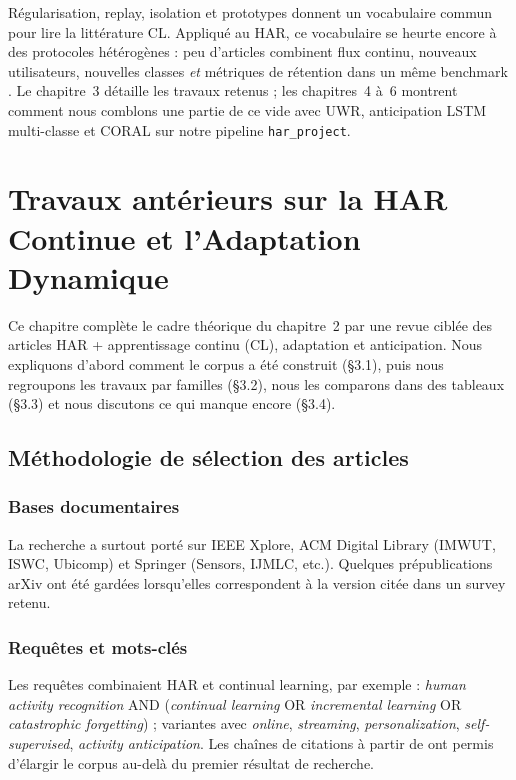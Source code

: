 \documentclass[a4paper,12pt]{report}
\begin{document}
Régularisation, replay, isolation et prototypes donnent un vocabulaire commun
pour lire la littérature CL. Appliqué au HAR, ce vocabulaire se heurte encore
à des protocoles hétérogènes : peu d'articles combinent flux continu, nouveaux
utilisateurs, nouvelles classes \emph{et} métriques de rétention dans un même
benchmark \parencite{schiemer2023,adaimi2022,liu2024,amrani2025}. Le chapitre~3
détaille les travaux retenus ; les chapitres~4 à~6 montrent comment nous
comblons une partie de ce vide avec UWR, anticipation LSTM multi-classe et CORAL sur
notre pipeline \texttt{har\_project}.

\clearpage


\clearpage
\chapter{Travaux antérieurs sur la HAR Continue et l'Adaptation Dynamique}
\label{ch:08-Chapter3}

Ce chapitre complète le cadre théorique du chapitre~2 par une revue ciblée des
articles HAR + apprentissage continu (CL), adaptation et anticipation. Nous
expliquons d'abord comment le corpus a été construit (§3.1), puis nous regroupons
les travaux par familles (§3.2), nous les comparons dans des tableaux (§3.3) et
nous discutons ce qui manque encore (§3.4).

\section{Méthodologie de sélection des articles}

\subsection{Bases documentaires}

La recherche a surtout porté sur IEEE Xplore, ACM Digital Library (IMWUT, ISWC,
Ubicomp) et Springer (Sensors, IJMLC, etc.). Quelques prépublications arXiv ont
été gardées lorsqu'elles correspondent à la version citée dans un survey retenu.

\subsection{Requêtes et mots-clés}

Les requêtes combinaient HAR et continual learning, par exemple :
\emph{human activity recognition} AND (\emph{continual learning} OR
\emph{incremental learning} OR \emph{catastrophic forgetting}) ; variantes avec
\emph{online}, \emph{streaming}, \emph{personalization}, \emph{self-supervised},
\emph{activity anticipation}. Les chaînes de citations à partir de
\parencite{delange2021,gu2021,wang2019,parisi2019} ont permis d'élargir le corpus
au-delà du premier résultat de recherche.
\end{document}
